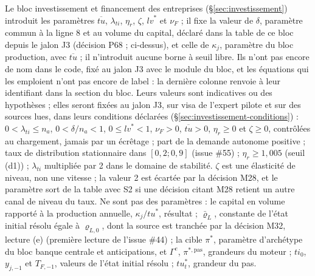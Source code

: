 \documentclass[11pt,a4paper]{article}
\begin{document}
\begin{proposee}
Le bloc investissement et financement des entreprises (\S\ref{sec:investissement}) introduit les paramètres $\overline{\mathit{tu}}$, $\lambda_{\mathit{ti}}$, $\eta_r$, $\zeta$, $\mathit{lv}^\ast$ et $\nu_F$ ; il fixe la valeur de $\delta$, paramètre commun à la ligne 8 et au volume du capital, déclaré dans la table de ce bloc depuis le jalon J3 (décision P68 ; ci-dessus), et celle de $\kappa_j$, paramètre du bloc production, avec $\overline{\mathit{tu}}$ ; il n'introduit aucune borne à seuil libre. Ils n'ont pas encore de nom dans le code, fixé au jalon J3 avec le module du bloc, et les équations qui les emploient n'ont pas encore de label : la dernière colonne renvoie à leur identifiant dans la section du bloc. Leurs valeurs sont indicatives ou des hypothèses ; elles seront fixées au jalon J3, sur visa de l'expert pilote et sur des sources lues, dans leurs conditions déclarées (\S\ref{sec:investissement-conditions}) : $0 < \lambda_{\mathit{ti}} \le n_a$, $0 < \delta/n_a < 1$, $0 \le \mathit{lv}^\ast < 1$, $\nu_F > 0$, $\overline{\mathit{tu}} > 0$, $\eta_r \ge 0$ et $\zeta \ge 0$, contrôlées au chargement, jamais par un écrêtage ; part de la demande autonome positive ; taux de distribution stationnaire dans $[0{,}2 ; 0{,}9]$ (issue \#55) ; $\eta_r \ge 1{,}005$ (seuil (d1)) ; $\lambda_{\mathit{ti}}$ multipliée par 2 dans le domaine de stabilité. $\zeta$ est une élasticité de niveau, non une vitesse ; la valeur 2 est écartée par la décision M28, et le paramètre sort de la table avec S2 si une décision citant M28 retient un autre canal de niveau du taux. Ne sont pas des paramètres : le capital en volume rapporté à la production annuelle, $\kappa_j/\mathit{tu}^\ast$, résultat ; $\bar\varrho_L$, constante de l'état initial résolu égale à $\varrho_{L,0}$, dont la source est tranchée par la décision M32, lecture (e) (première lecture de l'issue \#44) ; la cible $\pi^\ast$, paramètre d'archétype du bloc banque centrale et anticipations, et $\Gamma^e$, $\pi^{\ast,\mathrm{pas}}$, grandeurs du moteur ; $\mathit{ti}_0$, $y_{j,-1}$ et $T_{F,-1}$, valeurs de l'état initial résolu ; $\mathit{tu}^\ast_t$, grandeur du pas.
\end{proposee}
\end{document}
